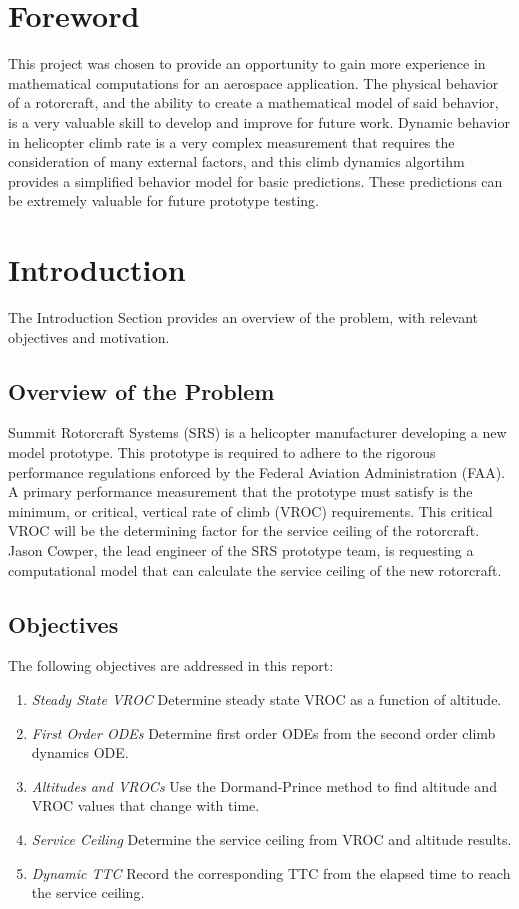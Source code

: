 \documentclass[12pt]{report}
\begin{document}
\chapter*{Foreword}

This project was chosen to provide an opportunity to gain more experience in mathematical computations for an aerospace
application. The physical behavior of a rotorcraft, and the ability to create a mathematical model of said behavior, is
a very valuable skill to develop and improve for future work. Dynamic behavior in helicopter climb rate is a very complex
measurement that requires the consideration of many external factors, and this climb dynamics algortihm provides a simplified
behavior model for basic predictions. These predictions can be extremely valuable for future prototype testing.

\newpage
{}
\setcounter{page}{1} %

\chapter{Introduction}
The Introduction Section provides an overview of the problem, with relevant objectives and motivation.
\section{Overview of the Problem} 
Summit Rotorcraft Systems (SRS) is a helicopter manufacturer developing a new model prototype. This prototype is required to
adhere to the rigorous performance regulations enforced by the Federal Aviation Administration (FAA). A primary performance
measurement that the prototype must satisfy is the minimum, or critical, vertical rate of climb (VROC) requirements. This critical
VROC will be the determining factor for the service ceiling of the rotorcraft. Jason Cowper, the lead engineer of the SRS prototype
team, is requesting a computational model that can calculate the service ceiling of the new rotorcraft.

\section{Objectives} 
The following objectives are addressed in this report:
\begin{enumerate}
    \item \textit{Steady State VROC} Determine steady state VROC as a function of altitude.
    \item \textit{First Order ODEs} Determine first order ODEs from the second order climb dynamics ODE.
    \item \textit{Altitudes and VROCs} Use the Dormand-Prince method to find altitude and VROC values that change with time.
    \item \textit{Service Ceiling} Determine the service ceiling from VROC and altitude results.
    \item \textit{Dynamic TTC} Record the corresponding TTC from the elapsed time to reach the service ceiling.
\end{enumerate}
\end{document}
